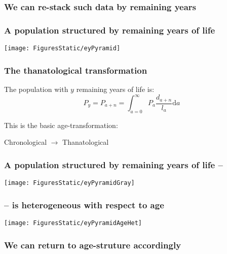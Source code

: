 \documentclass{beamer}
\begin{document}
\begin{frame}
\frametitle{We can re-stack such data by remaining years}
\end{frame}

\begin{frame}
\frametitle{A population structured by remaining years of life}
\texttt{[image: FiguresStatic/eyPyramid]}
\end{frame}

\begin{frame}
\frametitle{The thanatological transformation}
The population with $y$ remaining years of life is:
 \begin{equation}
   P_y = P_{a+n} = \int_{a=0}^\infty P_a \frac{d_{a+n}}{l_a} \mathrm{d} a
 \end{equation}
 
\pause
This is the basic age-transformation: 

Chronological $\rightarrow$ Thanatological 
\end{frame}


\begin{frame}
\frametitle{A population structured by remaining years of life --}
\texttt{[image: FiguresStatic/eyPyramidGray]}
\end{frame}


\begin{frame}
\frametitle{-- is heterogeneous with respect to age}
\texttt{[image: FiguresStatic/eyPyramidAgeHet]}
\end{frame}

\begin{frame}
\frametitle{We can return to age-struture accordingly}
\end{frame}
\end{document}
